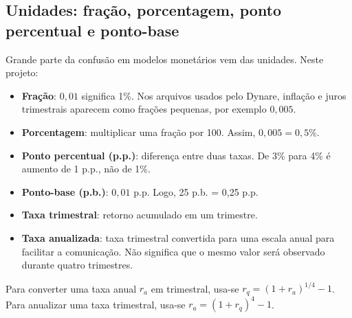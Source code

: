 \documentclass[11pt,a4paper]{article}
\begin{document}
\subsection{Unidades: fração, porcentagem, ponto percentual e ponto-base}
Grande parte da confusão em modelos monetários vem das unidades. Neste projeto:
\begin{itemize}[nosep]
  \item \textbf{Fração}: $0{,}01$ significa 1\%. Nos arquivos usados pelo Dynare, inflação e juros
        trimestrais aparecem como frações pequenas, por exemplo $0{,}005$.
  \item \textbf{Porcentagem}: multiplicar uma fração por 100. Assim, $0{,}005=0{,}5\%$.
  \item \textbf{Ponto percentual (p.p.)}: diferença entre duas taxas. De 3\% para 4\% é aumento de
        1 p.p., não de 1\%.
  \item \textbf{Ponto-base (p.b.)}: $0{,}01$ p.p. Logo, 25 p.b. = 0,25 p.p.
  \item \textbf{Taxa trimestral}: retorno acumulado em um trimestre.
  \item \textbf{Taxa anualizada}: taxa trimestral convertida para uma escala anual para facilitar a
        comunicação. Não significa que o mesmo valor será observado durante quatro trimestres.
\end{itemize}
Para converter uma taxa anual $r_a$ em trimestral, usa-se
$r_q=(1+r_a)^{1/4}-1$. Para anualizar uma taxa trimestral, usa-se
$r_a=(1+r_q)^4-1$.
\end{document}

